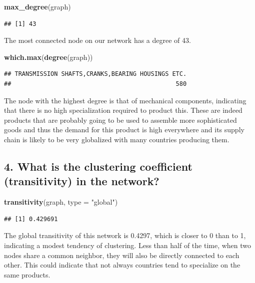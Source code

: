 \documentclass[
]{article}
\newenvironment{Shaded}{\begin{snugshade}}{\end{snugshade}}
\newcommand{\AttributeTok}[1]{\textcolor[rgb]{0.13,0.29,0.53}{#1}}
\newcommand{\FunctionTok}[1]{\textcolor[rgb]{0.13,0.29,0.53}{\textbf{#1}}}
\newcommand{\NormalTok}[1]{#1}
\newcommand{\StringTok}[1]{\textcolor[rgb]{0.31,0.60,0.02}{#1}}
\begin{document}
\begin{Shaded}
\begin{Highlighting}[]
\FunctionTok{max\_degree}\NormalTok{(graph)}
\end{Highlighting}
\end{Shaded}

\begin{verbatim}
## [1] 43
\end{verbatim}

The most connected node on our network has a degree of 43.

\begin{Shaded}
\begin{Highlighting}[]
\FunctionTok{which.max}\NormalTok{(}\FunctionTok{degree}\NormalTok{(graph))}
\end{Highlighting}
\end{Shaded}

\begin{verbatim}
## TRANSMISSION SHAFTS,CRANKS,BEARING HOUSINGS ETC. 
##                                              580
\end{verbatim}

The node with the highest degree is that of mechanical components,
indicating that there is no high specialization required to product
this. These are indeed products that are probably going to be used to
assemble more sophisticated goods and thus the demand for this product
is high everywhere and its supply chain is likely to be very globalized
with many countries producing them.

\subsection{4. What is the clustering coefficient (transitivity) in the
network?}\label{what-is-the-clustering-coefficient-transitivity-in-the-network}

\begin{Shaded}
\begin{Highlighting}[]
\FunctionTok{transitivity}\NormalTok{(graph, }\AttributeTok{type =} \StringTok{"global"}\NormalTok{)}
\end{Highlighting}
\end{Shaded}

\begin{verbatim}
## [1] 0.429691
\end{verbatim}

The global transitivity of this network is 0.4297, which is closer to 0
than to 1, indicating a modest tendency of clustering. Less than half of
the time, when two nodes share a common neighbor, they will also be
directly connected to each other. This could indicate that not always
countries tend to specialize on the same products.
\end{document}
